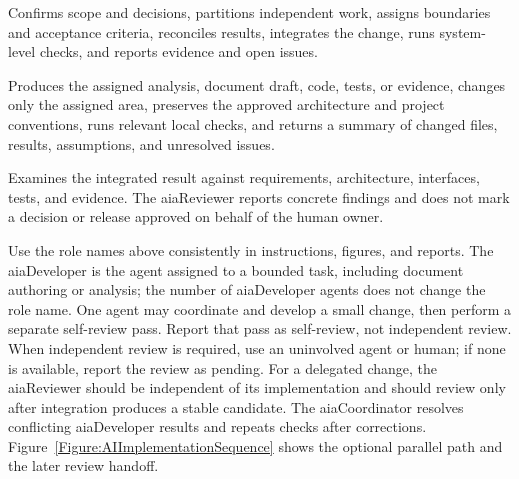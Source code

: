 \begin{description}[leftmargin=3.1cm,style=nextline]
\item[aiaCoordinator] Confirms scope and decisions, partitions independent work,
assigns boundaries and acceptance criteria, reconciles results, integrates the
change, runs system-level checks, and reports evidence and open issues.
\item[aiaDeveloper] Produces the assigned analysis, document draft, code, tests, or evidence,
changes only the assigned area, preserves the approved architecture and project conventions, runs relevant local checks, and returns
a summary of changed files, results, assumptions, and unresolved issues.
\item[aiaReviewer] Examines the integrated result against requirements,
architecture, interfaces, tests, and evidence. The aiaReviewer reports concrete
findings and does not mark a decision or release approved on behalf of the
human owner.
\end{description}

Use the role names above consistently in instructions, figures, and reports.
The aiaDeveloper is the agent assigned to a bounded task, including document
authoring or analysis; the
number of aiaDeveloper agents does not change the role name. One agent may coordinate and develop a small change, then perform a separate
self-review pass. Report that pass as self-review, not independent review.
When independent review is required, use an uninvolved agent or human; if none
is available, report the review as pending. For a delegated change,
the aiaReviewer should be independent of its implementation and should review
only after integration produces a stable candidate. The aiaCoordinator resolves
conflicting aiaDeveloper results and repeats checks after corrections. Figure~\ref{Figure:AIImplementationSequence}
shows the optional parallel path and the later review handoff.


